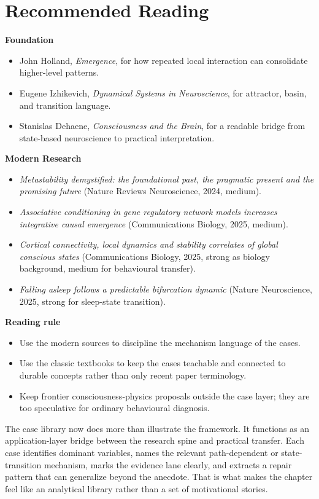 \section{Recommended Reading}

\begin{readingbox}
\textbf{Foundation}
\begin{itemize}[nosep]
  \item John Holland, \emph{Emergence}, for how repeated local interaction can
        consolidate higher-level patterns.
  \item Eugene Izhikevich, \emph{Dynamical Systems in Neuroscience}, for
        attractor, basin, and transition language.
  \item Stanislas Dehaene, \emph{Consciousness and the Brain}, for a readable
        bridge from state-based neuroscience to practical interpretation.
\end{itemize}
\textbf{Modern Research}
\begin{itemize}[nosep]
  \item \emph{Metastability demystified: the foundational past, the pragmatic
        present and the promising future} (Nature Reviews Neuroscience, 2024,
        medium).
  \item \emph{Associative conditioning in gene regulatory network models
        increases integrative causal emergence} (Communications Biology, 2025,
        medium).
  \item \emph{Cortical connectivity, local dynamics and stability correlates of
        global conscious states} (Communications Biology, 2025, strong as
        biology background, medium for behavioural transfer).
  \item \emph{Falling asleep follows a predictable bifurcation dynamic}
        (Nature Neuroscience, 2025, strong for sleep-state transition).
\end{itemize}
\textbf{Reading rule}
\begin{itemize}[nosep]
  \item Use the modern sources to discipline the mechanism language of the
        cases.
  \item Use the classic textbooks to keep the cases teachable and connected to
        durable concepts rather than only recent paper terminology.
  \item Keep frontier consciousness-physics proposals outside the case layer;
        they are too speculative for ordinary behavioural diagnosis.
\end{itemize}
\end{readingbox}

\begin{summarybox}
The case library now does more than illustrate the framework. It functions as
an application-layer bridge between the research spine and practical transfer.
Each case identifies dominant variables, names the relevant path-dependent or
state-transition mechanism, marks the evidence lane clearly, and extracts a
repair pattern that can generalize beyond the anecdote. That is what makes the
chapter feel like an analytical library rather than a set of motivational
stories.
\end{summarybox}
